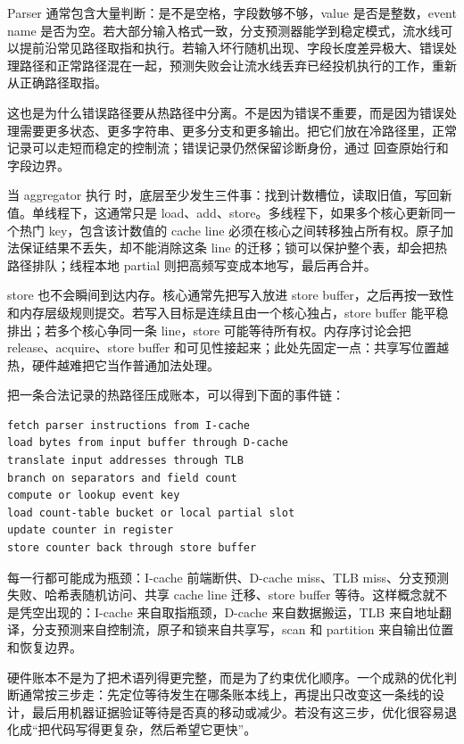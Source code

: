 Parser 通常包含大量判断：是不是空格，字段数够不够，value 是否是整数，event name 是否为空。若大部分输入格式一致，分支预测器能学到稳定模式，流水线可以提前沿常见路径取指和执行。若输入坏行随机出现、字段长度差异极大、错误处理路径和正常路径混在一起，预测失败会让流水线丢弃已经投机执行的工作，重新从正确路径取指。

这也是为什么错误路径要从热路径中分离。不是因为错误不重要，而是因为错误处理需要更多状态、更多字符串、更多分支和更多输出。把它们放在冷路径里，正常记录可以走短而稳定的控制流；错误记录仍然保留诊断身份，通过  回查原始行和字段边界。

当 aggregator 执行  时，底层至少发生三件事：找到计数槽位，读取旧值，写回新值。单线程下，这通常只是 load、add、store。多线程下，如果多个核心更新同一个热门 key，包含该计数值的 cache line 必须在核心之间转移独占所有权。原子加法保证结果不丢失，却不能消除这条 line 的迁移；锁可以保护整个表，却会把热路径排队；线程本地 partial 则把高频写变成本地写，最后再合并。

store 也不会瞬间到达内存。核心通常先把写入放进 store buffer，之后再按一致性和内存层级规则提交。若写入目标是连续且由一个核心独占，store buffer 能平稳排出；若多个核心争同一条 line，store 可能等待所有权。内存序讨论会把 release、acquire、store buffer 和可见性接起来；此处先固定一点：共享写位置越热，硬件越难把它当作普通加法处理。

把一条合法记录的热路径压成账本，可以得到下面的事件链：

\begin{lstlisting}[numbers=none,caption={一条合法日志记录的硬件事件链}]
fetch parser instructions from I-cache
load bytes from input buffer through D-cache
translate input addresses through TLB
branch on separators and field count
compute or lookup event key
load count-table bucket or local partial slot
update counter in register
store counter back through store buffer
\end{lstlisting}

每一行都可能成为瓶颈：I-cache 前端断供、D-cache miss、TLB miss、分支预测失败、哈希表随机访问、共享 cache line 迁移、store buffer 等待。这样概念就不是凭空出现的：I-cache 来自取指瓶颈，D-cache 来自数据搬运，TLB 来自地址翻译，分支预测来自控制流，原子和锁来自共享写，scan 和 partition 来自输出位置和恢复边界。

硬件账本不是为了把术语列得更完整，而是为了约束优化顺序。一个成熟的优化判断通常按三步走：先定位等待发生在哪条账本线上，再提出只改变这一条线的设计，最后用机器证据验证等待是否真的移动或减少。若没有这三步，优化很容易退化成“把代码写得更复杂，然后希望它更快”。

